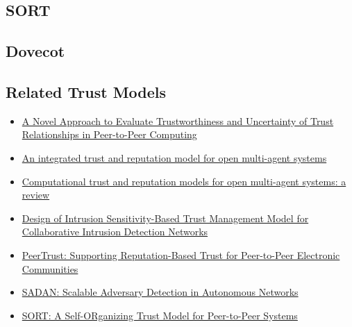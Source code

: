 \subsection{SORT}
\label{subsec:sort}

\subsection{Dovecot}
\label{subsec:dovecot}

\subsection{Related Trust Models}
\label{subsec:related-trust-models}

\begin{itemize}
    \item \href{https://share.goodnotes.com/s/60IVzs1mgmuPWF54Us5eKA}{A Novel Approach to Evaluate Trustworthiness and Uncertainty of Trust Relationships in Peer-to-Peer Computing} 
    \item \href{https://share.goodnotes.com/s/EziqqW185BzxHxNrZ6d1MQ}{An integrated trust and reputation model for open multi-agent systems}
    \item \href{https://share.goodnotes.com/s/MRfXxmu2Lz51IqK7JODn1N}{Computational trust and reputation models for open multi-agent systems: a review}
    \item \href{https://share.goodnotes.com/s/tafBG1KUZCuYT2E7a3ucc9}{Design of Intrusion Sensitivity-Based Trust Management Model for Collaborative Intrusion Detection Networks}
    \item \href{https://share.goodnotes.com/s/YQuoXUbYADa15Hwe90sXCM}{ PeerTrust: Supporting Reputation-Based Trust for Peer-to-Peer Electronic Communities}
    \item \href{https://share.goodnotes.com/s/hRHxSYlk6wU4BEn6u9Jcyu}{SADAN: Scalable Adversary Detection in Autonomous Networks}
    \item \href{https://share.goodnotes.com/s/bXWUbVFi5qBiAdBmJ4yYAx}{SORT: A Self-ORganizing Trust Model for Peer-to-Peer Systems}
\end{itemize}
